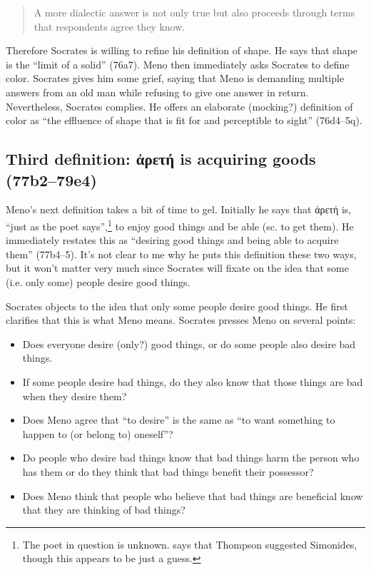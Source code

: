 \documentclass[11pt]{article}
\begin{document}
\begin{quote}
    A more dialectic answer is not only true but also proceeds through terms that respondents agree they know.
\end{quote}

Therefore Socrates is willing to refine his definition of shape. He says that shape is the ``limit of a solid'' (76a7). Meno then immediately asks Socrates to define color. Socrates gives him some grief, saying that Meno is demanding multiple answers from an old man while refusing to give one answer in return. Nevertheless, Socrates complies. He offers an elaborate (mocking?) definition of color as ``the effluence of shape that is fit for and perceptible to sight'' (76d4--5q).

\subsection{Third definition: {\g ἀρετή is acquiring goods} (77b2--79e4)}

Meno's next definition takes a bit of time to gel. Initially he says that {\g ἀρετή} is, ``just as the poet says'',\footnote{The poet in question is unknown. \citet[257]{bluck1961} says that Thompson suggested Simonides, though this appears to be just a guess.} to enjoy good things and be able (sc. to get them). He immediately restates this as ``desiring good things and being able to acquire them'' (77b4--5). It's not clear to me why he puts this definition these two ways, but it won't matter very much since Socrates will fixate on the idea that some (i.e. only some) people desire good things.

Socrates objects to the idea that only some people desire good things. He first clarifies that this is what Meno means. Socrates presses Meno on several points:

\begin{itemize}
    \item Does everyone desire (only?) good things, or do some people also desire bad things.
    \item If some people desire bad things, do they also know that those things are bad when they desire them?
    \item Does Meno agree that ``to desire'' is the same as ``to want something to happen to (or belong to) oneself''?
    \item Do people who desire bad things know that bad things harm the person who has them or do they think that bad things benefit their possessor?
    \item Does Meno think that people who believe that bad things are beneficial know that they are thinking of bad things?
\end{itemize}
\end{document}
